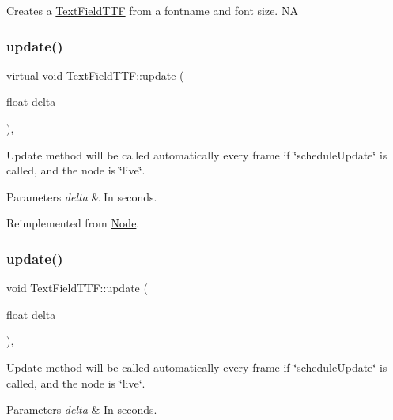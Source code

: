 Creates a \hyperlink{classTextFieldTTF}{Text\+Field\+T\+TF} from a fontname and font size.  NA \mbox{\label{classTextFieldTTF_a004230b3dc3f90069b3094152e7c8eb0}} 
\subsubsection{\texorpdfstring{update()}{update()}\hspace{0.1cm}{\footnotesize\ttfamily [1/2]}}
{\footnotesize\ttfamily virtual void Text\+Field\+T\+T\+F\+::update (\begin{DoxyParamCaption}\item[{float}]{delta }\end{DoxyParamCaption})\hspace{0.3cm}{\ttfamily [override]}, {\ttfamily [virtual]}}

Update method will be called automatically every frame if \char`\"{}schedule\+Update\char`\"{} is called, and the node is \char`\"{}live\char`\"{}. 
\begin{DoxyParams}{Parameters}
{\em delta} & In seconds. \\
\hline
\end{DoxyParams}


Reimplemented from \hyperlink{classNode_a32878481ba54b3856ab53c10af13848e}{Node}.

\mbox{\label{classTextFieldTTF_a81ad55bca952a4927d3c4acfe8385030}} 
\subsubsection{\texorpdfstring{update()}{update()}\hspace{0.1cm}{\footnotesize\ttfamily [2/2]}}
{\footnotesize\ttfamily void Text\+Field\+T\+T\+F\+::update (\begin{DoxyParamCaption}\item[{float}]{delta }\end{DoxyParamCaption})\hspace{0.3cm}{\ttfamily [override]}, {\ttfamily [virtual]}}

Update method will be called automatically every frame if \char`\"{}schedule\+Update\char`\"{} is called, and the node is \char`\"{}live\char`\"{}. 
\begin{DoxyParams}{Parameters}
{\em delta} & In seconds. \\
\hline
\end{DoxyParams}


